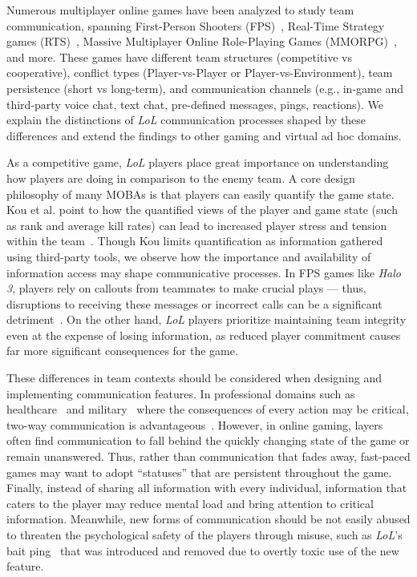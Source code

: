 Numerous multiplayer online games have been analyzed to study team communication, spanning First-Person Shooters (FPS)~\cite{tang2012verbal, taylor2012fps}, Real-Time Strategy games (RTS)~\cite{laato2024starcraft}, Massive Multiplayer Online Role-Playing Games (MMORPG)~\cite{petter2011}, and more. These games have different team structures (competitive vs cooperative), conflict types (Player-vs-Player or Player-vs-Environment), team persistence (short vs long-term), and communication channels (e.g., in-game and third-party voice chat, text chat, pre-defined messages, pings, reactions). We explain the distinctions of \textit{LoL} communication processes shaped by these differences and extend the findings to other gaming and virtual ad hoc domains.

As a competitive game, \textit{LoL} players place great importance on understanding how players are doing in comparison to the enemy team. A core design philosophy of many MOBAs is that players can easily quantify the game state. Kou et al. point to how the quantified views of the player and game state (such as rank and average kill rates) can lead to increased player stress and tension within the team~\cite{kou2018self}. Though Kou limits quantification as information gathered using third-party tools, we observe how the importance and availability of information access may shape communicative processes. In FPS games like \textit{Halo 3}, players rely on callouts from teammates to make crucial plays --- thus, disruptions to receiving these messages or incorrect calls can be a significant detriment~\cite{tang2012verbal, taylor2012fps}. On the other hand, \textit{LoL} players prioritize maintaining team integrity even at the expense of losing information, as reduced player commitment causes far more significant consequences for the game.

These differences in team contexts should be considered when designing and implementing communication features. In professional domains such as healthcare~\cite{roberts2014, chalupnik2020, evans2021} and military~\cite{pascual1999, capiola2020} where the consequences of every action may be critical, two-way communication is advantageous~\cite{zijlstra2012interaction}. However, in online gaming, layers often find communication to fall behind the quickly changing state of the game or remain unanswered. Thus, rather than communication that fades away, fast-paced games may want to adopt ``statuses'' that are persistent throughout the game. Finally, instead of sharing all information with every individual, information that caters to the player may reduce mental load and bring attention to critical information. Meanwhile, new forms of communication should be not easily abused to threaten the psychological safety of the players through misuse, such as \textit{LoL}'s bait ping~\cite{ramun2023} that was introduced and removed due to overtly toxic use of the new feature. 

